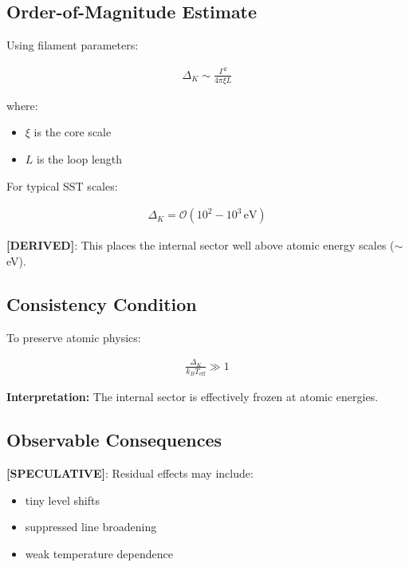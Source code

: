 \documentclass[11pt]{article}
\theoremstyle{definition}
\theoremstyle{plain}
\theoremstyle{remark}
\begin{document}
    \subsection{Order-of-Magnitude Estimate}
        
        Using filament parameters:
        
        \begin{align}
            \Delta_K \sim \frac{\Gamma^2}{4\pi \xi L}
        \end{align}
        
        where:
        \begin{itemize}
            \item $\xi$ is the core scale
            \item $L$ is the loop length
        \end{itemize}
        
        For typical SST scales:
        
        \begin{align}
            \Delta_K = \mathcal{O}(10^2 - 10^3 \, \text{eV})
        \end{align}
        
        \textbf{[DERIVED]}:
        This places the internal sector well above atomic energy scales ($\sim$ eV).
    
    \subsection{Consistency Condition}
        
        To preserve atomic physics:
        
        \begin{align}
            \frac{\Delta_K}{k_B T_{\text{eff}}} \gg 1
        \end{align}
        
        \textbf{Interpretation:}
        The internal sector is effectively frozen at atomic energies.
    
    \subsection{Observable Consequences}
        
        \textbf{[SPECULATIVE]}:
        Residual effects may include:
        
        \begin{itemize}
            \item tiny level shifts
            \item suppressed line broadening
            \item weak temperature dependence
        \end{itemize}
    
\end{document}
